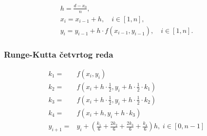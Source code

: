 \begin{gather*}
    h=\frac{d - x_0}{n},\\
    x_i = x_{i-1} + h,\quad i \in [1, n],\\
    y_i = y_{i-1} + h\cdot f(x_{i-1}, y_{i-1}),\quad i \in [1, n].
\end{gather*}

\subsubsection{Runge-Kutta četvrtog reda}

\begin{align*}
k_1 =& f(x_i, y_i)\\
k_2 =& f(x_i + h \cdot \frac{1}{2}, y_i + h \cdot \frac{1}{2}\cdot k_1)\\
k_3 =& f(x_i + h \cdot \frac{1}{2}, y_i + h \cdot \frac{1}{2}\cdot k_2)\\
k_4 =& f(x_i + h, y_i + h \cdot k_3)\\
y_{i+1} =& y_i + \left( \frac{k_1}{6} + \frac{2k_2}{6} + \frac{2k_3}{6} + \frac{k_4}{6}\right)h,\; i \in [0, n-1]
\end{align*}